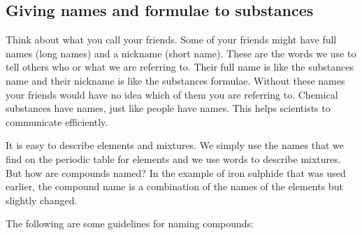             \subsection{ Giving names and formulae to substances}
            \nopagebreak
      \label{m38708*eip-379}Think about what you call your friends. Some of your friends might have full names (long names) and a nickname (short name). These are the words we use to tell others who or what we are referring to. Their full name is like the substances name and their nickname is like the substances formulae. Without these names your friends would have no idea which of them you are referring to. Chemical substances have names, just like people have names. This helps scientists to communicate efficiently.     \par \label{m38708*id64028}It is easy to describe elements and mixtures. We simply use the names that we find on the periodic table for elements and we use words to describe mixtures. But how are compounds named? In the example of iron sulphide that was used earlier, the compound name is a combination of the names of the elements but slightly changed. \par 
      \label{m38708*id64033}The following are some guidelines for naming compounds:\par 

